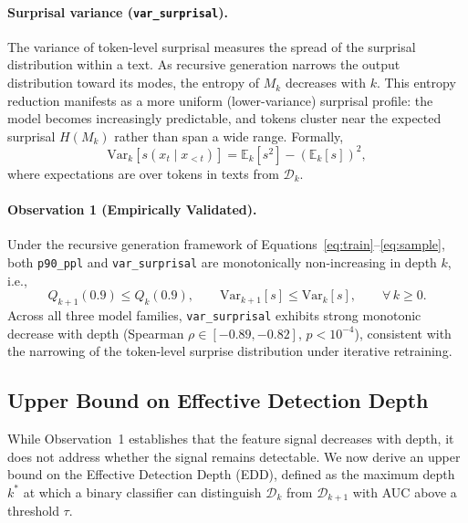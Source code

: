 \paragraph{Surprisal variance (\texttt{var\_surprisal}).}
The variance of token-level surprisal measures the spread of the surprisal distribution within a text. As recursive generation narrows the output distribution toward its modes, the entropy of $M_k$ decreases with $k$. This entropy reduction manifests as a more uniform (lower-variance) surprisal profile: the model becomes increasingly predictable, and tokens cluster near the expected surprisal $H(M_k)$ rather than span a wide range. Formally,
\begin{equation}
    \text{Var}_k[s(x_t \mid x_{<t})] = \mathbb{E}_k[s^2] - (\mathbb{E}_k[s])^2,
    \label{eq:var_surprisal}
\end{equation}
where expectations are over tokens in texts from $\mathcal{D}_k$.

\paragraph{Observation 1 (Empirically Validated).}
\label{prop:monotone}
Under the recursive generation framework of Equations~\eqref{eq:train}--\eqref{eq:sample}, both \texttt{p90\_ppl} and \texttt{var\_surprisal} are monotonically non-increasing in depth $k$, i.e.,
\begin{equation}
    Q_{k+1}(0.9) \leq Q_k(0.9), \qquad \text{Var}_{k+1}[s] \leq \text{Var}_k[s], \qquad \forall\, k \geq 0.
\end{equation}
Across all three model families, \texttt{var\_surprisal} exhibits strong monotonic decrease with depth (Spearman $\rho \in [-0.89, -0.82]$, $p < 10^{-4}$), consistent with the narrowing of the token-level surprise distribution under iterative retraining.

\subsection{Upper Bound on Effective Detection Depth}
\label{sec:theory:edd}

While Observation~1 establishes that the feature signal decreases with depth, it does not address whether the signal remains detectable. We now derive an upper bound on the Effective Detection Depth (EDD), defined as the maximum depth $k^*$ at which a binary classifier can distinguish $\mathcal{D}_k$ from $\mathcal{D}_{k+1}$ with AUC above a threshold $\tau$.


